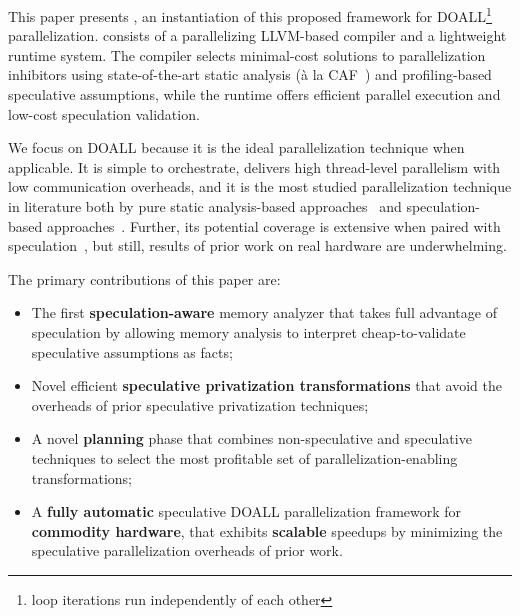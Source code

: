 This paper presents \name, an instantiation of this proposed framework
for DOALL\footnote{loop iterations run independently of each other}
parallelization. \name consists of a parallelizing LLVM-based compiler
and a lightweight
runtime system. The compiler selects minimal-cost solutions to
parallelization inhibitors using state-of-the-art static analysis
(\`{a} la CAF~\cite{johnson:cgo:17}) and profiling-based speculative
assumptions, while the runtime offers efficient parallel execution and
low-cost speculation validation.

We focus on DOALL because it is the ideal parallelization technique
when applicable. It is simple to orchestrate, delivers high
thread-level parallelism with low communication overheads, and it is
the most studied parallelization technique in literature both by pure
static analysis-based approaches~\cite{..,.,..} and speculation-based
approaches~\cite{..,..,..,..}.  Further, its potential coverage is
extensive when paired with speculation~\cite{zhong:08:hpca}, but still,
results of prior work on real hardware are underwhelming.

The primary contributions of this paper are:
\begin{itemize}

\item The first \textbf{speculation-aware} memory analyzer that takes
full advantage of speculation by allowing memory analysis to interpret
cheap-to-validate speculative assumptions as facts;

\item Novel efficient \textbf{speculative privatization transformations}
that avoid the overheads of prior speculative privatization
techniques;

\item A novel \textbf{planning} phase that combines non-speculative
and speculative techniques to select the most profitable set of
parallelization-enabling transformations;

\item A \textbf{fully automatic} speculative DOALL parallelization
framework for \textbf{commodity hardware}, that exhibits
\textbf{scalable} speedups by minimizing the speculative
parallelization overheads of prior work.

\end{itemize}

